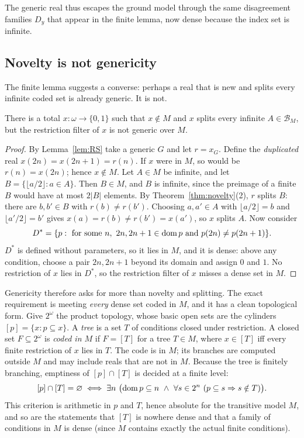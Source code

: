 The generic real thus escapes the ground model through the same disagreement families $D_y$ that
appear in the finite lemma, now dense because the index set is infinite.

\subsection{Novelty is not genericity}\label{ssec:converse}

The finite lemma suggests a converse: perhaps a real that is new and splits every infinite coded
set is already generic. It is not.

\begin{proposition}\label{prop:converse}
There is a total $x\colon\omega\to\{0,1\}$ such that $x\notin M$ and $x$ splits every infinite
$A\in\mathcal B_M$, but the restriction filter of $x$ is not generic over $M$.
\end{proposition}

\begin{proof}
By Lemma~\ref{lem:RS} take a generic $G$ and let $r=x_G$. Define the \emph{duplicated} real
$x(2n)=x(2n+1)=r(n)$. If $x$ were in $M$, so would be $r(n)=x(2n)$; hence $x\notin M$. Let $A\in M$
be infinite, and let $B=\{\lfloor a/2\rfloor:a\in A\}$. Then $B\in M$, and $B$ is infinite, since the
preimage of a finite $B$ would have at most $2|B|$ elements. By Theorem~\ref{thm:novelty}(2), $r$
splits $B$: there are $b,b'\in B$ with $r(b)\ne r(b')$. Choosing $a,a'\in A$ with $\lfloor
a/2\rfloor=b$ and $\lfloor a'/2\rfloor=b'$ gives $x(a)=r(b)\ne r(b')=x(a')$, so $x$ splits $A$.
Now consider
\[
  D^\ast=\{p:\ \text{for some }n,\ 2n,2n+1\in\operatorname{dom} p\text{ and }p(2n)\ne p(2n+1)\}.
\]
$D^\ast$ is defined without parameters, so it lies in $M$, and it is dense: above any condition,
choose a pair $2n,2n+1$ beyond its domain and assign $0$ and $1$. No restriction of $x$ lies in
$D^\ast$, so the restriction filter of $x$ misses a dense set in $M$.
\end{proof}

Genericity therefore asks for more than novelty and splitting. The exact requirement is meeting
\emph{every} dense set coded in $M$, and it has a clean topological form. Give $2^\omega$ the
product topology, whose basic open sets are the cylinders $[p]=\{x: p\subseteq x\}$. A \emph{tree} is a
set $T$ of conditions closed under restriction. A closed set $F\subseteq2^\omega$ is \emph{coded in
$M$} if $F=[T]$ for a tree $T\in M$, where $x\in[T]$ iff every finite restriction of $x$ lies in
$T$. The code is in $M$; its branches are computed outside $M$ and may include reals that are not
in $M$. Because the tree is finitely branching, emptiness of $[p]\cap[T]$ is decided at a finite
level:
\[
  [p]\cap[T]=\varnothing\iff\exists n\ \bigl(\operatorname{dom} p\subseteq n\ \wedge\ \forall s\in2^n\
  (p\subseteq s\Rightarrow s\notin T)\bigr).
\]
This criterion is arithmetic in $p$ and $T$, hence absolute for the transitive model $M$, and so
are the statements that $[T]$ is nowhere dense and that a family of conditions in $M$ is dense
(since $M$ contains exactly the actual finite conditions).

